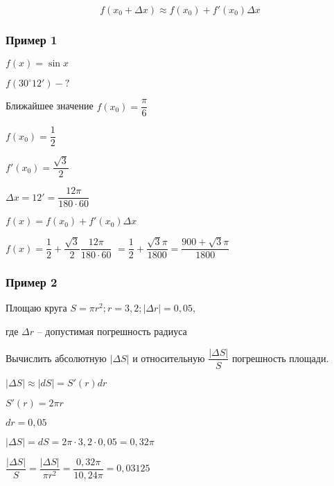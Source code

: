 $$
f(x_{0}+\Delta x)\approx f(x_{0}) + f'(x_{0}) \Delta x \label{approx_function}
$$

\subsubsection{Пример 1}

$ f(x) = \sin x $

$ f(30^{\circ} 12') - ? $

Ближайшее значение $ f(x_0) = \dfrac{\pi}{6} $

$ f(x_0) = \dfrac{1}{2} $

$ f'(x_0) = \dfrac{\sqrt{3}}{2} $

$ \Delta x = 12' = \dfrac{12 \pi}{180 \cdot 60} $

$ f(x) = f(x_0) + f'(x_0) \Delta x $

$ f(x) = \dfrac{1}{2} + \dfrac{\sqrt{3}}{2} \dfrac{12 \pi}{180 \cdot 60} $
$ = \dfrac{1}{2} + \dfrac{\sqrt{3}\pi}{1800} = \dfrac{900+\sqrt{3}\pi}{1800} $

\subsubsection{Пример 2}

Площаю круга $ S = \pi r^{2}; r = 3,2; |\Delta r| = 0,05 $,

где $ \Delta r $ -- допустимая погрешность радиуса

Вычислить абсолютную $ |\Delta S| $ и относительную $ \dfrac{|\Delta S|}{S} $ погрешность площади.

$ |\Delta S| \approx |dS| = S'(r)dr $

$ S'(r) = 2 \pi r $

$ dr = 0,05 $

$ |\Delta S| = dS = 2 \pi \cdot 3,2 \cdot 0,05 = 0,32 \pi $

$ \dfrac{|\Delta S|}{S} = \dfrac{|\Delta S|}{\pi r^{2}} = \dfrac{0,32 \pi}{10,24 \pi} = 0,03125 $

